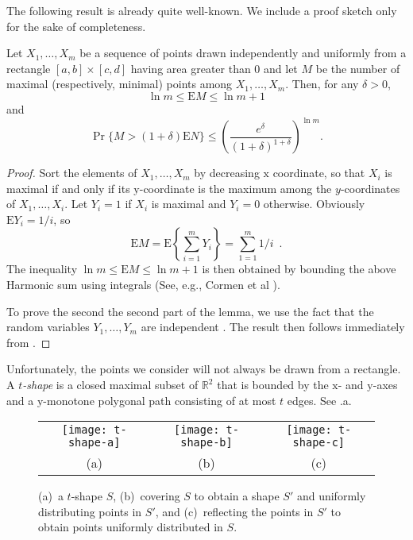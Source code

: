 \documentclass[lotsofwhite,charterfonts]{patmorin}
\newcommand{\RR}{\mathbb{R}}
\newcommand{\PROB}{\Pr}
\newcommand{\EXP}{\mathrm{E}}
\begin{document}
The following result is already quite well-known.  We include a
proof sketch only for the sake of completeness.

\begin{lem}
  Let $X_1,\ldots,X_m$ be a sequence of points drawn independently and
  uniformly from a rectangle $[a,b]\times[c,d]$ having area greater than
  0 and let $M$ be the number of maximal (respectively, minimal) points
  among $X_1,\ldots,X_m$.  Then, for any $\delta >0$,
  \begin{equation}
    \ln m \le \EXP{M} \le \ln m + 1
  \end{equation}
  and 
  \begin{equation}
    \PROB\{M>(1+\delta)\EXP{N}\} 
        \le \left(\frac{e^\delta}{(1+\delta)^{1+\delta}}\right)^{\ln m} .
  \end{equation}
\end{lem}

\begin{proof}
Sort the elements of $X_1,\ldots,X_m$ by decreasing $\mathrm{x}$
coordinate, so that $X_i$ is maximal if and only if its
$\mathrm{y}$-coordinate is the maximum among the $y$-coordinates of
$X_1,\ldots,X_i$.  Let $Y_i=1$ if $X_i$ is maximal and $Y_i=0$ otherwise.
Obviously $\EXP{Y_i}=1/i$, so
\[
   \EXP{M} = \EXP\left\{\sum_{i=1}^m Y_i\right\} = \sum_{1=1}^m 1/i \enspace .
\]
The inequality $\ln m \le \EXP{M}\le \ln m + 1$ is then obtained by
bounding the above Harmonic sum using integrals (See, e.g., Cormen et
al \cite[Appendix A.2]{clrs06}).

To prove the second the second part of the lemma, we use the fact
that the random variables $Y_1,\ldots,Y_m$ are independent \cite{d88,g78}.
The result then follows immediately from .
\end{proof}

Unfortunately, the points we consider will not always be drawn from a
rectangle.  A \emph{$t$-shape} is a closed maximal subset of $\RR^2$ that
is bounded by the $\mathrm x$- and $\mathrm y$-axes and a $\mathrm
y$-monotone polygonal path consisting of at most $t$ edges.  See
.a.

\begin{figure}
  \begin{center}
    \begin{tabular}{ccc}
      \texttt{[image: t-shape-a]} & 
      \texttt{[image: t-shape-b]} & 
      \texttt{[image: t-shape-c]} \\
      (a) & (b) & (c)
    \end{tabular}
  \end{center}
  \caption{(a)~a $t$-shape $S$, (b)~covering $S$ to obtain a shape $S'$ and
uniformly distributing points in $S'$, and (c)~reflecting the points in
$S'$ to obtain points uniformly distributed in $S$.}
\end{figure}
\end{document}
